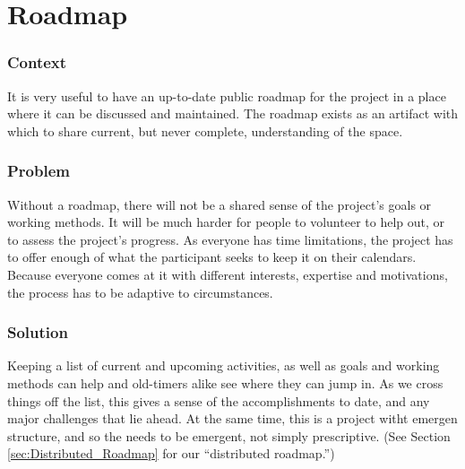 \section{Roadmap} \label{sec:Roadmap}

\subsubsection*{Context} It is very useful to have an up-to-date public roadmap for the project in a place where it can be discussed and maintained. The roadmap exists as an artifact with which to share current, but never complete, understanding of the space.

\subsubsection*{Problem} Without a roadmap, there will not be a shared sense of the project's goals or working methods. It will be much harder for people to volunteer to help out, or to assess the project's progress.  As everyone has time limitations, the project has to offer enough of what the participant seeks to keep it on their calendars.  Because everyone comes at it with different interests, expertise  and motivations, the process has to be adaptive to circumstances.

\subsubsection*{Solution} Keeping a list of current and upcoming activities, as well as goals and working methods can help  and old-timers alike see where they can jump in. As we cross things off the list, this gives a sense of the accomplishments to date, and any major challenges that lie ahead.  At the same time, this is a project witht emergen structure, and so the  needs to be emergent, not simply prescriptive.  (See Section \ref{sec:Distributed_Roadmap} for our ``distributed roadmap.'')

